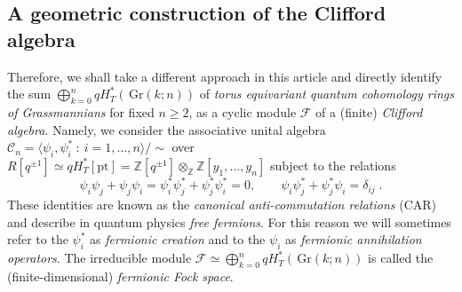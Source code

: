 \documentclass[12pt]{amsart}
\newcommand{\Z}{\mathbb{Z}}
\newcommand{\Gr}{\,\mathrm{Gr}}
\newcommand{\mc}[1]{\mathcal{#1}}
\newcommand{\ring}{R}
\numberwithin{equation}{section}
\numberwithin{figure}{section}
\begin{document}
\subsection{A geometric construction of the Clifford algebra}
Therefore, we shall take a different approach in this article and directly identify the sum $\bigoplus_{k=0}^nqH_T^*(\Gr(k;n))$ of {\em torus equivariant quantum cohomology rings of Grassmannians} for fixed $n\ge 2$, as a cyclic module $\mc{F}$ of a (finite) {\em Clifford algebra}. Namely, we consider the associative unital algebra  $\mc{C}_n=\langle\psi_i,\psi_i^*~:~i=1,\ldots,n\rangle/\sim$ over $\ring[q^{\pm 1}]\simeq qH^*_T[\mathrm{pt}]=\Z[q^{\pm 1}]\otimes_\Z\Z[y_1,\ldots,y_n]$ subject to the relations
\[
\psi_i\psi_j+\psi_j\psi_i=\psi_i^*\psi_j^*+\psi_j^*\psi_i^*=0,\qquad
\psi_i\psi^*_j+\psi_j^*\psi_i=\delta_{ij}\;.
\]
These identities are known as the {\em canonical anti-commutation relations} (CAR) and describe in quantum physics {\em free fermions}. For this reason we will sometimes refer to the $\psi_i^*$ as {\em fermionic creation} and to the $\psi_i$ as {\em fermionic annihilation operators}. The irreducible module $\mc{F}\simeq \bigoplus_{k=0}^nqH_T^*(\Gr(k;n))$ is called the (finite-dimensional) {\em fermionic Fock space}.
\end{document}
